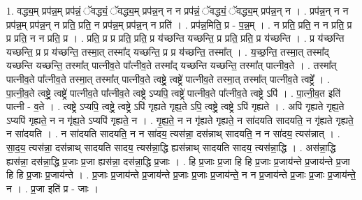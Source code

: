 \documentclass[17pt]{extarticle}
\begin{document}
1. वद्ध्य॒म् प्रप॑न्न॒म् प्रप॑न्नं॒ ॅवद्ध्यं॒ ॅवद्ध्य॒म् प्रप॑न्न॒न् न न प्रप॑न्नं॒ ॅवद्ध्यं॒ ॅवद्ध्य॒म् प्रप॑न्न॒न् न । . प्रप॑न्न॒न् न न प्रप॑न्न॒म् प्रप॑न्न॒न् न प्रति॒ प्रति॒ न प्रप॑न्न॒म् प्रप॑न्न॒न् न प्रति॑ । . प्रप॑न्न॒मिति॒ प्र - प॒न्न॒म् । . न प्रति॒ प्रति॒ न न प्रति॒ प्र प्र प्रति॒ न न प्रति॒ प्र । . प्रति॒ प्र प्र प्रति॒ प्रति॒ प्र य॑च्छन्ति यच्छन्ति॒ प्र प्रति॒ प्रति॒ प्र य॑च्छन्ति । . प्र य॑च्छन्ति यच्छन्ति॒ प्र प्र य॑च्छन्ति॒ तस्मा॒त् तस्मा᳚द् यच्छन्ति॒ प्र प्र य॑च्छन्ति॒ तस्मा᳚त् । . य॒च्छ॒न्ति॒ तस्मा॒त् तस्मा᳚द् यच्छन्ति यच्छन्ति॒ तस्मा᳚त् पात्नीव॒ते पा᳚त्नीव॒ते तस्मा᳚द् यच्छन्ति यच्छन्ति॒ तस्मा᳚त् पात्नीव॒ते । . तस्मा᳚त् पात्नीव॒ते पा᳚त्नीव॒ते तस्मा॒त् तस्मा᳚त् पात्नीव॒ते त्वष्ट्रे॒ त्वष्ट्रे॑ पात्नीव॒ते तस्मा॒त् तस्मा᳚त् पात्नीव॒ते त्वष्ट्रे᳚ । . पा॒त्नी॒व॒ते त्वष्ट्रे॒ त्वष्ट्रे॑ पात्नीव॒ते पा᳚त्नीव॒ते त्वष्ट्रे ऽप्यपि॒ त्वष्ट्रे॑ पात्नीव॒ते पा᳚त्नीव॒ते त्वष्ट्रे ऽपि॑ । . पा॒त्नी॒व॒त इति॑ पात्नी - व॒ते । . त्वष्ट्रे ऽप्यपि॒ त्वष्ट्रे॒ त्वष्ट्रे ऽपि॑ गृह्यते गृह्य॒ते ऽपि॒ त्वष्ट्रे॒ त्वष्ट्रे ऽपि॑ गृह्यते । . अपि॑ गृह्यते गृह्य॒ते ऽप्यपि॑ गृह्यते॒ न न गृ॑ह्य॒ते ऽप्यपि॑ गृह्यते॒ न । . गृ॒ह्य॒ते॒ न न गृ॑ह्यते गृह्यते॒ न सा॑दयति सादयति॒ न गृ॑ह्यते गृह्यते॒ न सा॑दयति । . न सा॑दयति सादयति॒ न न सा॑दय॒ त्यस॑न्ना॒ दस॑न्नाथ् सादयति॒ न न सा॑दय॒ त्यस॑न्नात् । . सा॒द॒य॒ त्यस॑न्ना॒ दस॑न्नाथ् सादयति सादय॒ त्यस॑न्ना॒द्धि ह्यस॑न्नाथ् सादयति सादय॒ त्यस॑न्ना॒द्धि । . अस॑न्ना॒द्धि ह्यस॑न्ना॒ दस॑न्ना॒द्धि प्र॒जाः प्र॒जा ह्यस॑न्ना॒ दस॑न्ना॒द्धि प्र॒जाः । . हि प्र॒जाः प्र॒जा हि हि प्र॒जाः प्र॒जाय॑न्ते प्र॒जाय॑न्ते प्र॒जा हि हि प्र॒जाः प्र॒जाय॑न्ते । . प्र॒जाः प्र॒जाय॑न्ते प्र॒जाय॑न्ते प्र॒जाः प्र॒जाः प्र॒जाय॑न्ते॒ न न प्र॒जाय॑न्ते प्र॒जाः प्र॒जाः प्र॒जाय॑न्ते॒ न । . प्र॒जा इति॑ प्र - जाः । \newline
\end{document}
